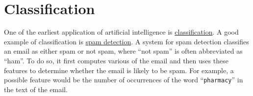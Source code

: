 \chapter{Classification \label{chapter:classification}}
One of the earliest application of artificial intelligence is 
\href{https://en.wikipedia.org/wiki/Statistical_classification}{classification}.  A good
example of classification is \href{https://en.wikipedia.org/wiki/Anti-spam_techniques#Detecting_spam}{spam detection}.
A system for spam detection classifies an email as either spam or not spam, where ``not spam'' is often
abbreviated as ``ham''.  To do so, it first
computes various   of the email and then uses these features to determine whether
the email is likely to be spam.  For example, a possible feature would be the number of occurrences of the word
``\texttt{pharmacy}'' in the text of the email.

